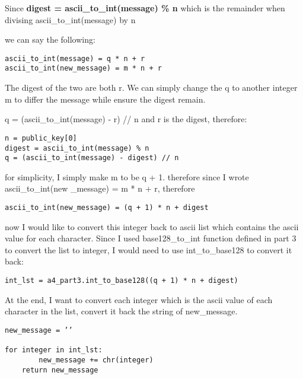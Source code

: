 \documentclass[11pt]{article}
\begin{document}
\begin{enumerate}
Since \textbf{digest = ascii\_to\_int(message) \% n} which is the remainder when divising ascii\_to\_int(message) by n

we can say the following:
\begin{verbatim}
ascii_to_int(message) = q * n + r
ascii_to_int(new_message) = m * n + r
\end{verbatim}
The digest of the two are both r. We can simply change the q to another integer m to differ the message while ensure the digest remain.

q = (ascii\_to\_int(message) - r) // n and r is the digest, therefore:
\begin{verbatim}
n = public_key[0]
digest = ascii_to_int(message) % n
q = (ascii_to_int(message) - digest) // n
\end{verbatim}
for simplicity, I simply make m to be q + 1. therefore since I wrote ascii\_to\_int(new
\_message) = m * n + r, therefore
\begin{verbatim}
ascii_to_int(new_message) = (q + 1) * n + digest
\end{verbatim}
now I would like to convert this integer back to ascii list which contains the ascii value for each character. Since I used base128\_to\_int function defined in part 3 to convert the list to integer, I would need to use int\_to\_base128 to convert it back:
\begin{verbatim}
int_lst = a4_part3.int_to_base128((q + 1) * n + digest)
\end{verbatim}
At the end, I want to convert each integer which is the ascii value of each character in the list, convert it back the string of new\_message.
\begin{verbatim}
new_message = ’’

for integer in int_lst:
        new_message += chr(integer)
    return new_message
\end{verbatim}

\end{enumerate}
\end{document}
